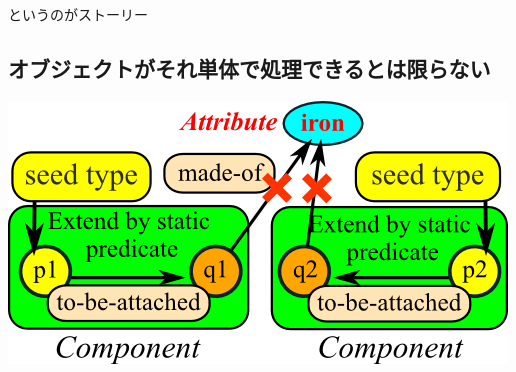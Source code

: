 というのがストーリー

\subsection{オブジェクトがそれ単体で処理できるとは限らない}
\label{sec-1-6}

\includegraphics[width=.9\linewidth]{img/abstract-component.png}

